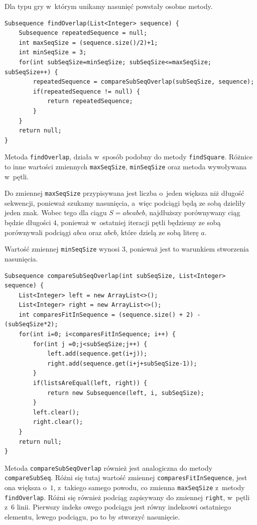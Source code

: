 \documentclass[document]{xmgr}
\begin{document}
Dla typu gry w~którym unikamy nasunięć powstały osobne metody.

\begin{lstlisting}[frame=single]
Subsequence findOverlap(List<Integer> sequence) {
	Subsequence repeatedSequence = null;
	int maxSeqSize = (sequence.size()/2)+1;
	int minSeqSize = 3;
	for(int subSeqSize=minSeqSize; subSeqSize<=maxSeqSize; subSeqSize++) {
		repeatedSequence = compareSubSeqOverlap(subSeqSize, sequence);
		if(repeatedSequence != null) {
			return repeatedSequence;
		}
	}
	return null;
}
\end{lstlisting}

Metoda \texttt{findOverlap}, działa w~sposób podobny do metody \texttt{findSquare}. Różnice to inne wartości zmiennych \texttt{maxSeqSize}, \texttt{minSeqSize} oraz metoda wywoływana w~pętli.

Do zmiennej \texttt{maxSeqSize} przypisywana jest liczba o~jeden większa niż długość sekwencji, ponieważ szukamy nasunięcia, a~więc podciągi będą ze sobą dzieliły jeden znak. Wobec tego dla ciągu $S = abcabcb$, najdłuższy porównywany ciąg będzie długości $4$, ponieważ w~ostatniej iteracji pętli będziemy ze sobą porównywali podciągi $abca$ oraz $abcb$, które dzielą ze sobą literę $a$.

Wartość zmiennej \texttt{minSeqSize} wynosi $3$, ponieważ jest to warunkiem stworzenia nasunięcia.

\begin{lstlisting}[frame=single]
Subsequence compareSubSeqOverlap(int subSeqSize, List<Integer> sequence) {
	List<Integer> left = new ArrayList<>();
	List<Integer> right = new ArrayList<>();
	int comparesFitInSequence = (sequence.size() + 2) - (subSeqSize*2);
	for(int i=0; i<comparesFitInSequence; i++) {
		for(int j =0;j<subSeqSize;j++) {
			left.add(sequence.get(i+j));
			right.add(sequence.get(i+j+subSeqSize-1));
		}
		if(listsAreEqual(left, right)) {
			return new Subsequence(left, i, subSeqSize);
		}
		left.clear();
		right.clear();
	}
	return null;
} 
\end{lstlisting}

Metoda \texttt{compareSubSeqOverlap} również jest analogiczna do metody \texttt{compareSubSeq}. Różni się tutaj wartość zmiennej \texttt{comparesFitInSequence}, jest ona większa o~$1$, z~takiego samego powodu, co zmienna \texttt{maxSeqSize} z~metody \texttt{findOverlap}. Różni się również podciąg zapisywany do zmiennej \texttt{right}, w~pętli z~6 linii. Pierwszy indeks owego podciągu jest równy indeksowi ostatniego elementu, lewego podciągu, po to by stworzyć nasunięcie.
\end{document}
